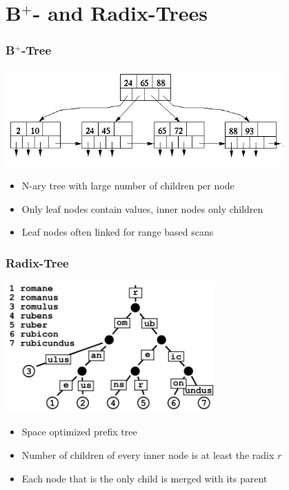 \documentclass{beamer}
\begin{document}
\section{B$^{+}$- and Radix-Trees}
\begin{frame}
\frametitle{B$^{+}$-Tree}
	\begin{center}
		\includegraphics[width=0.8\textwidth]{img/b_tree.png}
	\end{center}
	\begin{itemize}
		\item N-ary tree with large number of children per node
		\item Only leaf nodes contain values, inner nodes only children
		\item Leaf nodes often linked for range based scans
	\end{itemize}
\end{frame}
\begin{frame}
\frametitle{Radix-Tree}
	\begin{center}
	\includegraphics[width=0.6\textwidth]{img/radix_tree.png}
	\end{center}
	\begin{itemize}
		\item Space optimized prefix tree
		\item Number of children of every inner node is at least the radix $r$
		\item Each node that is the only child is merged with its parent
	\end{itemize}

\end{frame}
\end{document}
